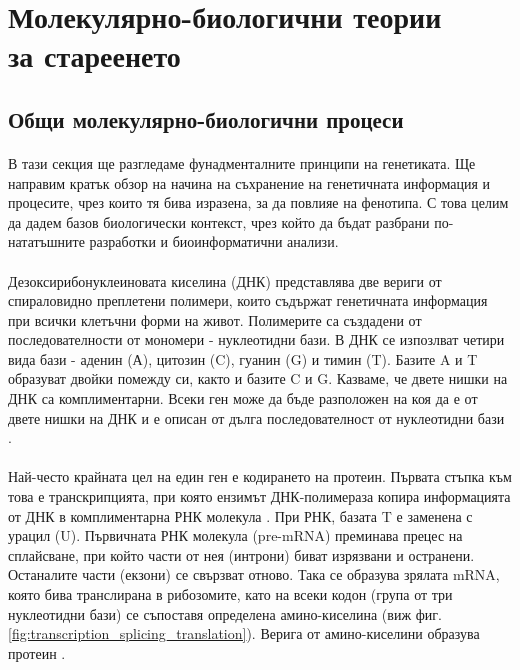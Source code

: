 \documentclass[pdftex,cyrillic,14pt,a4page,twoside]{extreport}
\begin{document}
\section[Молекулярно-биологични теории за стареенето]{Молекулярно-биологични теории\\ за стареенето}
\subsection{Общи молекулярно-биологични процеси}
\paragraph{}
В тази секция ще разгледаме фунадменталните принципи на генетиката. Ще направим кратък обзор на начина на съхранение на генетичната информация и процесите, чрез които тя бива изразена, за да повлияе на фенотипа. С това целим да дадем базов биологически контекст, чрез който да бъдат разбрани по-нататъшните разработки и биоинформатични анализи.

\paragraph{}
Дезоксирибонуклеиновата киселина (ДНК) представлява две вериги от спираловидно преплетени полимери, които съдържат генетичната информация при всички клетъчни форми на живот. Полимерите са създадени от последователности от мономери - нуклеотидни бази. В ДНК се изпозлват четири вида бази - аденин (А), цитозин (C), гуанин (G) и тимин (T). Базите A и T образуват двойки помежду си, както и базите C и G. Казваме, че двете нишки на ДНК са комплиментарни. Всеки ген може да бъде разположен на коя да е от двете нишки на ДНК и е описан от дълга последователност от нуклеотидни бази \cite[стр. 301-310]{klug2014}.

\paragraph{}
Най-често крайната цел на един ген е кодирането на протеин. Първата стъпка към това е транскрипцията, при която ензимът ДНК-полимераза копира информацията от ДНК в комплиментарна РНК молекула \cite{sims2004}. При РНК, базата T е заменена с урацил (U). Първичната РНК молекула (pre-mRNA) преминава прецес на сплайсване, при който части от нея (интрони) биват изрязвани и остранени. Останалите части (екзони) се свързват отново. Така се образува зрялата mRNA, която бива транслирана в рибозомите, като на всеки кодон (група от три нуклеотидни бази) се съпоставя определена амино-киселина (виж фиг. \ref{fig:transcription_splicing_translation}). Верига от амино-киселини образува протеин \cite[стр. 412-420]{klug2014}.
\end{document}
